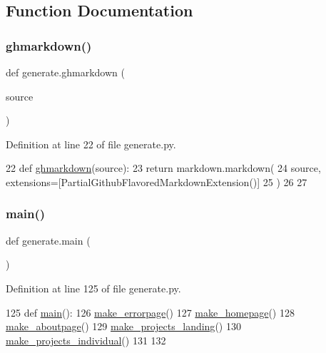 \subsection{Function Documentation}
\mbox{\label{namespacegenerate_a7811fd26fa2e3aeec0e3d3851cdda546}} 
\subsubsection{\texorpdfstring{ghmarkdown()}{ghmarkdown()}}
{\footnotesize\ttfamily def generate.\+ghmarkdown (\begin{DoxyParamCaption}\item[{}]{source }\end{DoxyParamCaption})}



Definition at line 22 of file generate.\+py.


\begin{DoxyCode}
22 \textcolor{keyword}{def }\hyperlink{namespacegenerate_a7811fd26fa2e3aeec0e3d3851cdda546}{ghmarkdown}(source):
23     \textcolor{keywordflow}{return} markdown.markdown(
24         source, extensions=[PartialGithubFlavoredMarkdownExtension()]
25     )
26 
27 
\end{DoxyCode}
\mbox{\label{namespacegenerate_a7f0253880883fcd9badd715587a15668}} 
\subsubsection{\texorpdfstring{main()}{main()}}
{\footnotesize\ttfamily def generate.\+main (\begin{DoxyParamCaption}{ }\end{DoxyParamCaption})}



Definition at line 125 of file generate.\+py.


\begin{DoxyCode}
125 \textcolor{keyword}{def }\hyperlink{namespacegenerate_a7f0253880883fcd9badd715587a15668}{main}():
126     \hyperlink{namespacegenerate_a1c52bc54613c3a13c908bc65d7911b8e}{make\_errorpage}()
127     \hyperlink{namespacegenerate_acffbc7c203626a1f396da4a96a2d448d}{make\_homepage}()
128     \hyperlink{namespacegenerate_afa732feea0def89a5b9d1a2a6549ee60}{make\_aboutpage}()
129     \hyperlink{namespacegenerate_a33f954414406a12534e313700841053e}{make\_projects\_landing}()
130     \hyperlink{namespacegenerate_a7e834fd25099e451f5809b35df4ef10d}{make\_projects\_individual}()
131 
132 
\end{DoxyCode}
\mbox{\label{namespacegenerate_afa732feea0def89a5b9d1a2a6549ee60}} 
